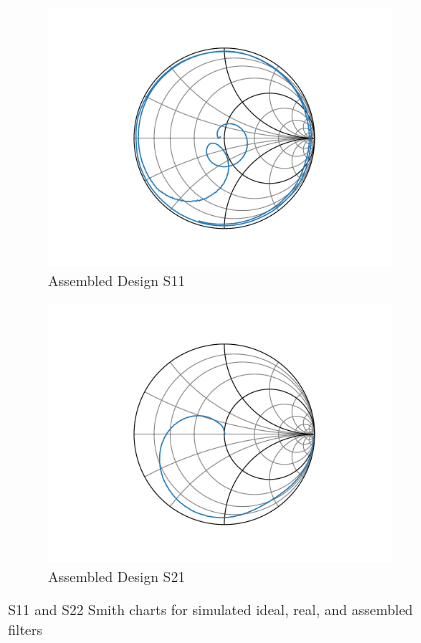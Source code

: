 \documentclass[letterpaper,12pt]{article}
\begin{document}
\begin{figure}[H]
    \begin{subfigure}[t]{.49\textwidth}
      \centering
      \includegraphics[width=\linewidth]{figures/8.s11.assembled}
      \caption{Assembled Design S11}
    \end{subfigure}
    \hfill
    \begin{subfigure}[t]{.49\textwidth}
      \centering
      \includegraphics[width=\linewidth]{figures/8.s21.assembled}
      \caption{Assembled Design S21}
    \end{subfigure}
    \vspace{0.5cm}
    \caption{S11 and S22 Smith charts for simulated ideal, real, and assembled filters}
\end{figure}
\end{document}
